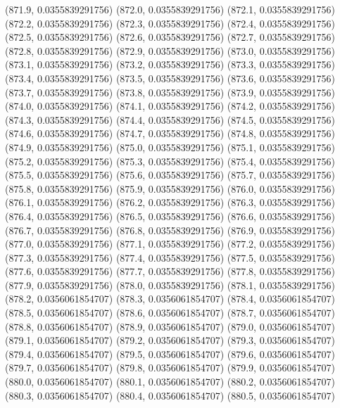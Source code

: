 {					(871.9, 0.0355839291756)
					(872.0, 0.0355839291756)
					(872.1, 0.0355839291756)
					(872.2, 0.0355839291756)
					(872.3, 0.0355839291756)
					(872.4, 0.0355839291756)
					(872.5, 0.0355839291756)
					(872.6, 0.0355839291756)
					(872.7, 0.0355839291756)
					(872.8, 0.0355839291756)
					(872.9, 0.0355839291756)
					(873.0, 0.0355839291756)
					(873.1, 0.0355839291756)
					(873.2, 0.0355839291756)
					(873.3, 0.0355839291756)
					(873.4, 0.0355839291756)
					(873.5, 0.0355839291756)
					(873.6, 0.0355839291756)
					(873.7, 0.0355839291756)
					(873.8, 0.0355839291756)
					(873.9, 0.0355839291756)
					(874.0, 0.0355839291756)
					(874.1, 0.0355839291756)
					(874.2, 0.0355839291756)
					(874.3, 0.0355839291756)
					(874.4, 0.0355839291756)
					(874.5, 0.0355839291756)
					(874.6, 0.0355839291756)
					(874.7, 0.0355839291756)
					(874.8, 0.0355839291756)
					(874.9, 0.0355839291756)
					(875.0, 0.0355839291756)
					(875.1, 0.0355839291756)
					(875.2, 0.0355839291756)
					(875.3, 0.0355839291756)
					(875.4, 0.0355839291756)
					(875.5, 0.0355839291756)
					(875.6, 0.0355839291756)
					(875.7, 0.0355839291756)
					(875.8, 0.0355839291756)
					(875.9, 0.0355839291756)
					(876.0, 0.0355839291756)
					(876.1, 0.0355839291756)
					(876.2, 0.0355839291756)
					(876.3, 0.0355839291756)
					(876.4, 0.0355839291756)
					(876.5, 0.0355839291756)
					(876.6, 0.0355839291756)
					(876.7, 0.0355839291756)
					(876.8, 0.0355839291756)
					(876.9, 0.0355839291756)
					(877.0, 0.0355839291756)
					(877.1, 0.0355839291756)
					(877.2, 0.0355839291756)
					(877.3, 0.0355839291756)
					(877.4, 0.0355839291756)
					(877.5, 0.0355839291756)
					(877.6, 0.0355839291756)
					(877.7, 0.0355839291756)
					(877.8, 0.0355839291756)
					(877.9, 0.0355839291756)
					(878.0, 0.0355839291756)
					(878.1, 0.0355839291756)
					(878.2, 0.0356061854707)
					(878.3, 0.0356061854707)
					(878.4, 0.0356061854707)
					(878.5, 0.0356061854707)
					(878.6, 0.0356061854707)
					(878.7, 0.0356061854707)
					(878.8, 0.0356061854707)
					(878.9, 0.0356061854707)
					(879.0, 0.0356061854707)
					(879.1, 0.0356061854707)
					(879.2, 0.0356061854707)
					(879.3, 0.0356061854707)
					(879.4, 0.0356061854707)
					(879.5, 0.0356061854707)
					(879.6, 0.0356061854707)
					(879.7, 0.0356061854707)
					(879.8, 0.0356061854707)
					(879.9, 0.0356061854707)
					(880.0, 0.0356061854707)
					(880.1, 0.0356061854707)
					(880.2, 0.0356061854707)
					(880.3, 0.0356061854707)
					(880.4, 0.0356061854707)
					(880.5, 0.0356061854707)
}
